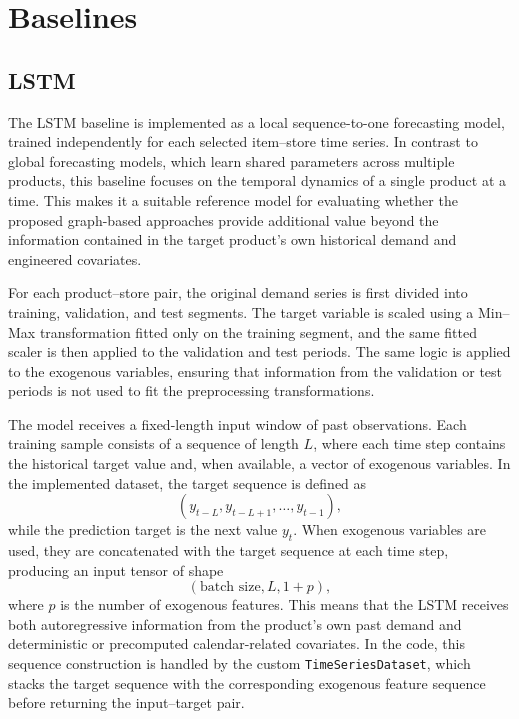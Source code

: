 \chapter{Baselines}

\section{LSTM}


The LSTM baseline is implemented as a local sequence-to-one forecasting model, trained independently for each selected item--store time series. In contrast to global forecasting models, which learn shared parameters across multiple products, this baseline focuses on the temporal dynamics of a single product at a time. This makes it a suitable reference model for evaluating whether the proposed graph-based approaches provide additional value beyond the information contained in the target product's own historical demand and engineered covariates.

For each product--store pair, the original demand series is first divided into training, validation, and test segments. The target variable is scaled using a Min--Max transformation fitted only on the training segment, and the same fitted scaler is then applied to the validation and test periods. The same logic is applied to the exogenous variables, ensuring that information from the validation or test periods is not used to fit the preprocessing transformations.

The model receives a fixed-length input window of past observations. Each training sample consists of a sequence of length \(L\), where each time step contains the historical target value and, when available, a vector of exogenous variables. In the implemented dataset, the target sequence is defined as
\[
(y_{t-L}, y_{t-L+1}, \ldots, y_{t-1}),
\]
while the prediction target is the next value \(y_t\). When exogenous variables are used, they are concatenated with the target sequence at each time step, producing an input tensor of shape
\[
(\text{batch size}, L, 1 + p),
\]
where \(p\) is the number of exogenous features. This means that the LSTM receives both autoregressive information from the product's own past demand and deterministic or precomputed calendar-related covariates. In the code, this sequence construction is handled by the custom \texttt{TimeSeriesDataset}, which stacks the target sequence with the corresponding exogenous feature sequence before returning the input--target pair.


